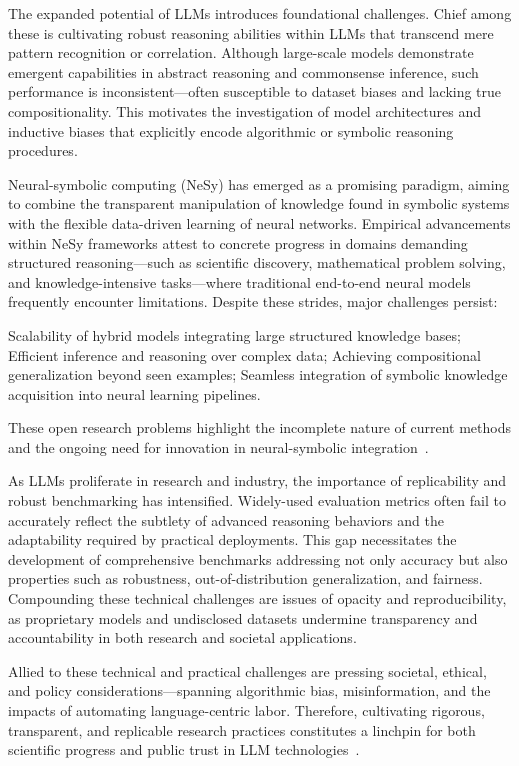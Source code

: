 \documentclass[sigconf]{acmart}
\begin{document}
The expanded potential of LLMs introduces foundational challenges. Chief among these is cultivating robust reasoning abilities within LLMs that transcend mere pattern recognition or correlation. Although large-scale models demonstrate emergent capabilities in abstract reasoning and commonsense inference, such performance is inconsistent—often susceptible to dataset biases and lacking true compositionality. This motivates the investigation of model architectures and inductive biases that explicitly encode algorithmic or symbolic reasoning procedures.

Neural-symbolic computing (NeSy) has emerged as a promising paradigm, aiming to combine the transparent manipulation of knowledge found in symbolic systems with the flexible data-driven learning of neural networks. Empirical advancements within NeSy frameworks attest to concrete progress in domains demanding structured reasoning—such as scientific discovery, mathematical problem solving, and knowledge-intensive tasks—where traditional end-to-end neural models frequently encounter limitations. Despite these strides, major challenges persist:

Scalability of hybrid models integrating large structured knowledge bases;
Efficient inference and reasoning over complex data;
Achieving compositional generalization beyond seen examples;
Seamless integration of symbolic knowledge acquisition into neural learning pipelines.

These open research problems highlight the incomplete nature of current methods and the ongoing need for innovation in neural-symbolic integration~\cite{ref49,ref54}.

As LLMs proliferate in research and industry, the importance of replicability and robust benchmarking has intensified. Widely-used evaluation metrics often fail to accurately reflect the subtlety of advanced reasoning behaviors and the adaptability required by practical deployments. This gap necessitates the development of comprehensive benchmarks addressing not only accuracy but also properties such as robustness, out-of-distribution generalization, and fairness. Compounding these technical challenges are issues of opacity and reproducibility, as proprietary models and undisclosed datasets undermine transparency and accountability in both research and societal applications.

Allied to these technical and practical challenges are pressing societal, ethical, and policy considerations—spanning algorithmic bias, misinformation, and the impacts of automating language-centric labor. Therefore, cultivating rigorous, transparent, and replicable research practices constitutes a linchpin for both scientific progress and public trust in LLM technologies~\cite{ref42,ref54,ref86}.
\end{document}
